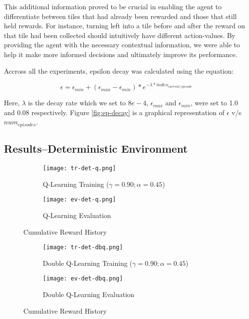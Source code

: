 \documentclass{article} %
\begin{document}
This additional information proved to be crucial in enabling the agent to differentiate
between tiles that had already been rewarded and those that still held rewards. For instance,
turning left into a tile before and after the reward on that tile had been collected should
intuitively have different action-values. By providing the agent with the necessary
contextual information, we were able to help it make more informed decisions and ultimately
improve its performance.

Accross all the experiments, epsilon decay was calculated using the equation:

\begin{equation}
    \epsilon=\epsilon_{min}+(\epsilon_{max}-\epsilon_{min})*e^{-\lambda*index_{current\_episode}}
    \label{eqn:ep-decay}
\end{equation}

Here, $\lambda$ is the decay rate which we set to $8e-4$, $\epsilon_{max}$ and $\epsilon_{min}$,
were set to 1.0 and 0.08 respectively. Figure \ref{fig:ep-decay} is a graphical
representation of $\epsilon$ v/s $num_{episodes}$.

\subsection{Results--Deterministic Environment}

\begin{figure}[ht]
    \begin{subfigure}{.45\textwidth}
        \centering
        \texttt{[image: tr-det-q.png]}
        \caption{Q-Learning Training ($\gamma=0.90; \alpha=0.45$)}
        \label{fig:tr-det-q}
    \end{subfigure}
    \hfill
    \begin{subfigure}{.45\textwidth}
        \centering
        \texttt{[image: ev-det-q.png]}
        \caption{Q-Learning Evaluation}
        \label{fig:ev-det-q}
    \end{subfigure}
    \caption{Cumulative Reward History}
\end{figure}


\begin{figure}[ht]
    \begin{subfigure}{.45\textwidth}
        \centering
        \texttt{[image: tr-det-dbq.png]}
        \caption{Double Q-Learning Training ($\gamma=0.90; \alpha=0.45$)}
        \label{fig:tr-det-dbq}
    \end{subfigure}
    \hfill
    \begin{subfigure}{.45\textwidth}
        \centering
        \texttt{[image: ev-det-dbq.png]}
        \caption{Double Q-Learning Evaluation}
        \label{fig:ev-det-dbq}
    \end{subfigure}
    \caption{Cumulative Reward History}
\end{figure}
\end{document}
